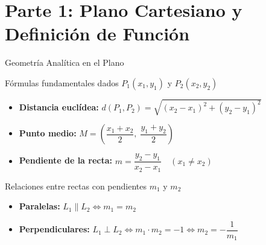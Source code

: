 \documentclass[aspectratio=169]{beamer}
\begin{document}
\begin{frame}[plain]
  \titlepage
\end{frame}

\section{Parte 1: Plano Cartesiano y Definición de Función}


\begin{frame}{Geometría Analítica en el Plano}
  \begin{block}{Fórmulas fundamentales dados $P_1(x_1, y_1)$ y $P_2(x_2, y_2)$}
    \begin{itemize}
      \item \textbf{Distancia euclídea:} $d(P_1, P_2) = \sqrt{(x_2 - x_1)^2 + (y_2 - y_1)^2}$
      \item \textbf{Punto medio:} $M = \left(\dfrac{x_1 + x_2}{2}, \; \dfrac{y_1 + y_2}{2}\right)$
      \item \textbf{Pendiente de la recta:} $m = \dfrac{y_2 - y_1}{x_2 - x_1} \quad (x_1 \neq x_2)$
    \end{itemize}
  \end{block}

  \vspace{4pt}
  \begin{block}{Relaciones entre rectas con pendientes $m_1$ y $m_2$}
    \begin{itemize}
      \item \textbf{Paralelas:} $L_1 \parallel L_2 \iff m_1 = m_2$
      \item \textbf{Perpendiculares:} $L_1 \perp L_2 \iff m_1 \cdot m_2 = -1 \iff m_2 = -\dfrac{1}{m_1}$
    \end{itemize}
  \end{block}
\end{frame}
\end{document}
